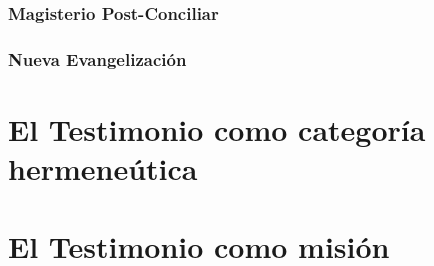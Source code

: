 \subsubsection{Magisterio Post-Conciliar}

\subsubsection{Nueva Evangelización}

\section{El Testimonio como categoría hermeneútica}

\section{El Testimonio como misión}
